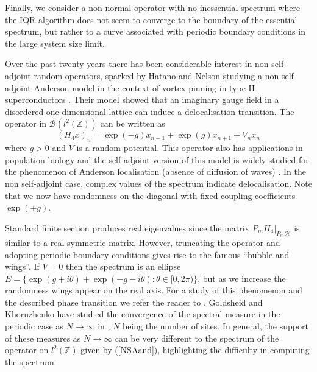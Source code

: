 \documentclass[a4paper,10pt]{article}
\begin{document}
\begin{example}
Finally, we consider a non-normal operator with no inessential spectrum where the IQR algorithm does not seem to converge to the boundary of the essential spectrum, but rather to a curve associated with periodic boundary conditions in the large system size limit.

Over the past twenty years there has been considerable interest in non self-adjoint random operators, sparked by Hatano and Nelson studying a non self-adjoint Anderson model in the context of vortex pinning in type-II superconductors \cite{hatano1996localization}. Their model showed that an imaginary gauge field in a disordered one-dimensional lattice can induce a delocalisation transition. The operator in $\mathcal{B}(l^2(\mathbb{Z}))$ can be written as
\begin{equation}
(H_4x)_n=\exp({-g})x_{n-1}+\exp({g})x_{n+1}+V_nx_n
\label{NSAand}
\end{equation}
where $g>0$ and $V$ is a random potential. This operator also has applications in population biology \cite{nelson1998non} and the self-adjoint version of this model is widely studied for the phenomenon of Anderson localisation (absence of diffusion of waves) \cite{anderson1958absence,billy2008direct}. In the non self-adjoint case, complex values of the spectrum indicate delocalisation. Note that we now have randomness on the diagonal with fixed coupling coefficients $\exp({\pm g})$.

Standard finite section produces real eigenvalues since the matrix $P_mH_4|_{P_m\mathcal{H}}$ is similar to a real symmetric matrix. However, truncating the operator and adopting periodic boundary conditions gives rise to the famous ``bubble and wings''. If $V=0$ then the spectrum is an ellipse $E=\{\exp({g+i\theta})+\exp({-g-i\theta}):\theta\in[0,2\pi)\}$, but as we increase the randomness wings appear on the real axis. For a study of this phenomenon and the described phase transition we refer the reader to \cite{feinberg1999non}. Goldsheid and Khoruzhenko have studied the convergence of the spectral measure in the periodic case as $N\rightarrow\infty$ in \cite{goldsheid1998distribution}, $N$ being the number of sites. In general, the support of these measures as $N\rightarrow\infty$ can be very different to the spectrum of the operator on $l^2(\mathbb{Z})$ given by (\ref{NSAand}), highlighting the difficulty in computing the spectrum.


\end{example}
\end{document}
